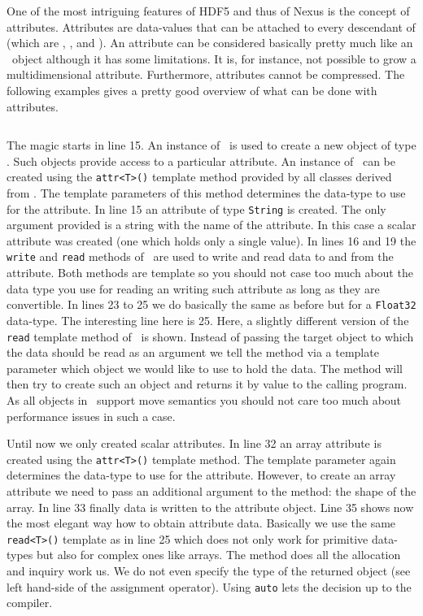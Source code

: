One of the most intriguing features of HDF5 and thus of Nexus is the concept of
attributes. Attributes are data-values that can be attached to every descendant
of \nxobject (which are \nxgroup, \nxfile, and \nxfield). An attribute can be considered basically pretty much like an 
\nxfield\ object although it has some limitations. It is, for instance, not
possible to grow a multidimensional attribute. Furthermore, attributes cannot be
compressed. 
The following examples gives a pretty good overview of what can be done with
attributes.
\inputminted[linenos=true]{c++}{../examples/c++/nxgroup_ex2.cpp}
The magic starts in line 15. An instance of \nxgroup\ is used to create a new
object of type \nxattribute. Such objects provide access to a particular
attribute. An instance of \nxattribute\ can be created using the {\tt attr<T>()}
template method provided by all classes derived from \nxobject.
The template parameters of this method determines the data-type to use for 
the attribute. In line 15 an attribute of type {\tt String} is created.
The only argument provided is a string with the name of the attribute. 
In this case a scalar attribute was created (one which holds only a single
value). In lines 16 and 19 the {\tt write} and {\tt read} methods of 
\nxattribute\ are used to write and read data to and from the attribute. 
Both methods are template so you should not case too much about the data type
you use for reading an writing such attribute as long as they are convertible. 
In lines 23 to 25 we do basically the same as before but for a {\tt Float32}
data-type. The interesting line here is 25. Here, a slightly different version
of the {\tt read} template method of \nxattribute\ is shown. Instead of passing
the target object to which the data should be read as an argument we tell the
method via a template parameter which object we would like to use to hold the
data. The method will then try to create such an object and returns it by value
to the calling program. As all objects in \pninx\ support move semantics you
should not care too much about performance issues in such a case. 

Until now we only created scalar attributes. In line 32 an array attribute is
created using the {\tt attr<T>()} template method. The template parameter again
determines the data-type to use for the attribute. However, to create an array
attribute we need to pass an additional argument to the method: the shape of the
array. In line 33 finally data is written to the attribute object.
Line 35 shows now the most elegant way how to obtain attribute data. Basically
we use the same {\tt read<T>()} template as in line 25 which does not only work
for primitive data-types but also for complex ones like arrays. 
The method does all the allocation and inquiry work us. We do not even specify
the type of the returned object (see left hand-side of the assignment operator).
Using {\tt auto} lets the decision up to the compiler. 

